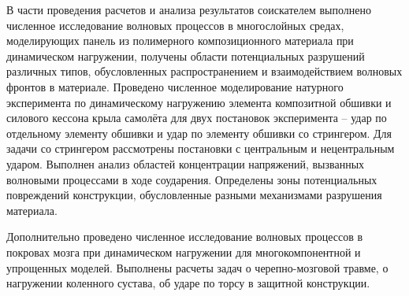 В части проведения расчетов и анализа результатов соискателем выполнено численное исследование волновых процессов в многослойных средах, моделирующих панель из полимерного композиционного материала при динамическом нагружении, получены области потенциальных разрушений различных типов, обусловленных распространением и взаимодействием волновых фронтов в материале. Проведено численное моделирование натурного эксперимента по динамическому нагружению элемента композитной обшивки и силового кессона крыла самолёта для двух постановок эксперимента -- удар по отдельному элементу обшивки и удар по элементу обшивки со стрингером. Для задачи со стрингером рассмотрены постановки с центральным и нецентральным ударом. Выполнен анализ областей концентрации напряжений, вызванных волновыми процессами в ходе соударения. Определены зоны потенциальных повреждений конструкции, обусловленные разными механизмами разрушения материала.

Дополнительно проведено численное исследование волновых процессов в покровах мозга при динамическом нагружении для многокомпонентной и упрощенных моделей. Выполнены расчеты задач о черепно-мозговой травме, о нагружении коленного сустава, об ударе по торсу в защитной конструкции.

